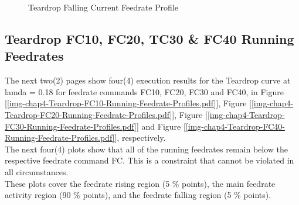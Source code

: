 \begin{figure}
	\caption  {Teardrop Falling Current Feedrate Profile}
	\label{img-chap4-Teardrop Falling Current Feedrate Profile.pdf}
\end{figure}	

\clearpage
\pagebreak

\subsection{Teardrop FC10, FC20, TC30 \& FC40 Running Feedrates}
\label{ssec-chap4-Teardrop-FC10-Running-Feedrate-Profiles}

The next two(2) pages show four(4) execution results for the Teardrop curve at lamda = 0.18 for feedrate commands FC10, FC20, FC30 and FC40, in Figure [\ref{img-chap4-Teardrop-FC10-Running-Feedrate-Profiles.pdf}], 
Figure [\ref{img-chap4-Teardrop-FC20-Running-Feedrate-Profiles.pdf}], 
Figure [\ref{img-chap4-Teardrop-FC30-Running-Feedrate-Profiles.pdf}] and 
Figure [\ref{img-chap4-Teardrop-FC40-Running-Feedrate-Profiles.pdf}], respectively.\\

The next four(4) plots show that all of the running feedrates remain below the respective feedrate command FC. This is a constraint that cannot be violated in all circumstances. \\

These plots cover the feedrate rising region (5 \% points), the main feedrate activity region (90 \% points), and the feedrate falling region (5 \% points). \\

